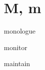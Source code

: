 \section{M, m}

\begin{word}{monologue}
\end{word}

\begin{word}{monitor}
\end{word}

\begin{word}{maintain}
\end{word}